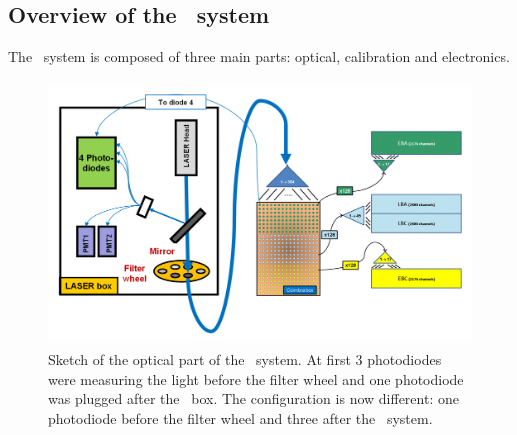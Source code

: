 


\subsection{Overview of the \lasa~system}

The \lasa~system is composed of three main parts: optical, calibration and electronics.

\begin{figure}[htbp]
\centering
\includegraphics[height=7cm]{figures/FullSystem.png}
\caption{Sketch of the optical part of the \lasa~system. At first 3 photodiodes were measuring the light before the filter wheel and one photodiode was plugged after the \coimbra~box. The configuration is now different: one photodiode before the filter wheel and three after the \coimbra~system.}\label{fig:lasaoptical}
\end{figure}


